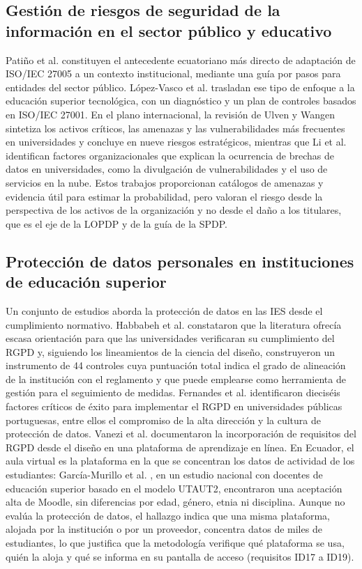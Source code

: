 \subsection{Gestión de riesgos de seguridad de la información en el sector público y educativo}

Patiño et al. \cite{patino2018ict} constituyen el antecedente ecuatoriano más directo de adaptación de ISO/IEC 27005 a un contexto institucional, mediante una guía por pasos para entidades del sector público. López-Vasco et al. \cite{lopezvasco2025iso} trasladan ese tipo de enfoque a la educación superior tecnológica, con un diagnóstico y un plan de controles basados en ISO/IEC 27001. En el plano internacional, la revisión de Ulven y Wangen \cite{ulven2021systematic} sintetiza los activos críticos, las amenazas y las vulnerabilidades más frecuentes en universidades y concluye en nueve riesgos estratégicos, mientras que Li et al. \cite{li2023breach} identifican factores organizacionales que explican la ocurrencia de brechas de datos en universidades, como la divulgación de vulnerabilidades y el uso de servicios en la nube. Estos trabajos proporcionan catálogos de amenazas y evidencia útil para estimar la probabilidad, pero valoran el riesgo desde la perspectiva de los activos de la organización y no desde el daño a los titulares, que es el eje de la LOPDP y de la guía de la SPDP.

\subsection{Protección de datos personales en instituciones de educación superior}

Un conjunto de estudios aborda la protección de datos en las IES desde el cumplimiento normativo. Habbabeh et al. \cite{habbabeh2019assessment} constataron que la literatura ofrecía escasa orientación para que las universidades verificaran su cumplimiento del RGPD y, siguiendo los lineamientos de la ciencia del diseño, construyeron un instrumento de 44 controles cuya puntuación total indica el grado de alineación de la institución con el reglamento y que puede emplearse como herramienta de gestión para el seguimiento de medidas. Fernandes et al. \cite{fernandes2022csf} identificaron dieciséis factores críticos de éxito para implementar el RGPD en universidades públicas portuguesas, entre ellos el compromiso de la alta dirección y la cultura de protección de datos. Vanezi et al. \cite{vanezi2019inform} documentaron la incorporación de requisitos del RGPD desde el diseño en una plataforma de aprendizaje en línea. En Ecuador, el aula virtual es la plataforma en la que se concentran los datos de actividad de los estudiantes: García-Murillo et al. \cite{garcia2023moodle}, en un estudio nacional con docentes de educación superior basado en el modelo UTAUT2, encontraron una aceptación alta de Moodle, sin diferencias por edad, género, etnia ni disciplina. Aunque no evalúa la protección de datos, el hallazgo indica que una misma plataforma, alojada por la institución o por un proveedor, concentra datos de miles de estudiantes, lo que justifica que la metodología verifique qué plataforma se usa, quién la aloja y qué se informa en su pantalla de acceso (requisitos ID17 a ID19).

